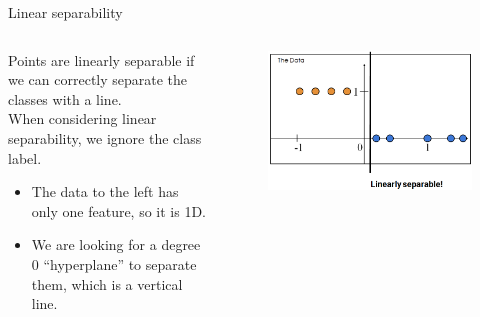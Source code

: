 \documentclass[aspectratio=169]{../latex_main/tntbeamer}  %
\begin{document}
	 \begin{frame}{Linear separability}
	    \begin{columns}
	        \begin{column}{.5\textwidth}
	            Points are linearly separable if we can correctly separate the classes with a line.\\
	            When considering linear separability, we ignore the class label. 
	            \begin{itemize}
	                \item The data to the left has only one feature, so it is 1D.
	                \item We are looking for a degree 0 “hyperplane” to separate them, which is a vertical line.
	            \end{itemize}  
	        \end{column}
	        
	        
	        
	        \begin{column}{.5\textwidth}
	                \begin{figure}
	                    \centering
	                    \includegraphics[scale=.35]{Bild44}
	                \end{figure}
	                
	        \end{column}
	    \end{columns}
	 \end{frame}
	 
\end{document}
